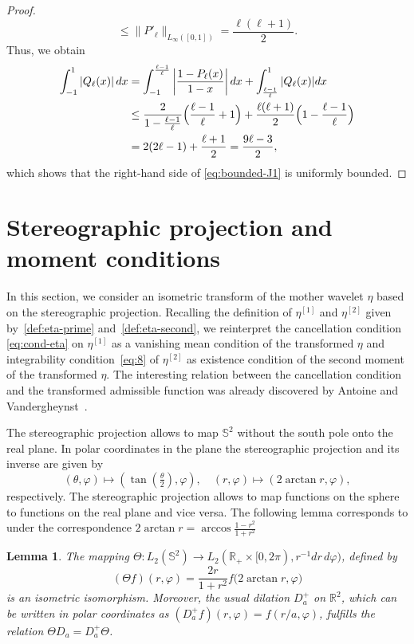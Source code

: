 \documentclass[a4paper,11pt,DIV=11,%
abstract=on%
]{scrartcl}
\newtheorem{lemma}[thm]{Lemma}
\def\R{{\mathbb R}}
\newcommand{\red}[1]{#1}
\newcommand{\blue}[1]{#1}
\begin{document}
\begin{proof}
$$	\leq \| P'_\ell\|_{L_\infty([0,1])} = \frac{\ell(\ell+1)}{2}. $$
	Thus, we obtain
	\begin{align*}
		\int_{-1}^{1} \left|Q_\ell (x) \right| dx
		&= \int_{-1}^{\frac{\ell-1}{\ell}} \left| \frac{1-P_\ell (x)}{1-x} \right| dx
		+ \int_{\frac{\ell-1}{\ell}}^{1} |Q_\ell (x) | dx\\
		&\leq \frac{2}{1-\frac{\ell-1}{\ell}}\Bigl(\frac{\ell-1}{\ell}+1\Bigr)
		+ \frac{\ell(\ell+1)}{2}\Bigl(1-\frac{\ell-1}{\ell}\Bigr)\\
		&=2(2\ell-1)+\frac{\ell+1}{2}=\frac{9\ell - 3}{2},
	\end{align*}	
	which shows that the right-hand side of \eqref{eq:bounded-J1} is uniformly bounded.
\end{proof}

\section{Stereographic projection and moment conditions} \label{ssec:stereo}
In this section, we consider an isometric transform of the mother wavelet $\eta$ based on the stereographic projection.
\red{Recalling the definition of $\eta^{[1]}$ and $\eta^{[2]}$ given
  by~\eqref{def:eta-prime} and~\eqref{def:eta-second}}, we reinterpret the cancellation condition \eqref{eq:cond-eta} on $\eta^{[1]}$
as a vanishing mean condition of the transformed $\eta$ 
and integrability condition~\red{\eqref{eq:8}} of $\eta^{[2]}$ as existence condition of the second moment of the transformed $\eta$.
The interesting relation between the cancellation condition and the transformed admissible function was already
discovered by Antoine and \blue{Vandergheynst}~\cite{AV99}.

The stereographic projection allows to map $\mathbb S^2$ 
without the south pole onto the real plane.
In polar coordinates in the plane the stereographic projection and its inverse are given by
$$(\theta,\varphi)\mapsto(\tan(\tfrac{\theta}{2}),\varphi), \quad
(r,\varphi)\mapsto (2\arctan r,\varphi),
$$ 
respectively.
The stereographic projection allows to map functions on the sphere to functions on the real plane and vice versa.
The following lemma  corresponds to
\cite[Lemma 3.5]{AV99} under the correspondence $2\arctan r=\arccos\frac{1-r^2}{1+r^2}$

\begin{lemma}\label{lemma-stereo}
	The mapping 	$\Theta:L_2(\mathbb S^2)\rightarrow L_2(\R_+\times[0,2\pi),r^{-1}dr\,d\varphi)$, defined by 
		$$(\Theta f)(r,\varphi)=\frac{2r}{1+r^2}f\bigl(2\arctan r,\varphi\bigr)$$
	is an isometric isomorphism.
	Moreover, the usual dilation  $D_a^+$ on $\R^2$, which can be written in polar coordinates 
	as $(D_a^+ f)(r,\varphi)=f(r/a,\varphi)$, fulfills the relation
	$\Theta D_a=D_a^+\Theta$.
\end{lemma}
\end{document}

